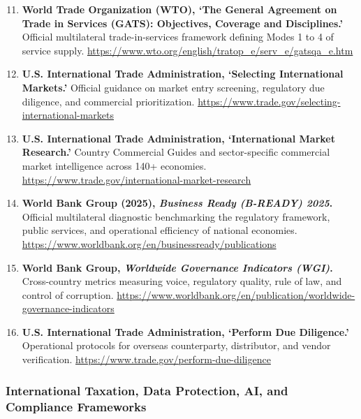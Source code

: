\begin{enumerate}
    \setcounter{enumi}{10}
    \item \textbf{World Trade Organization (WTO), `The General Agreement on Trade in Services (GATS): Objectives, Coverage and Disciplines.'} Official multilateral trade-in-services framework defining Modes 1 to 4 of service supply. \url{https://www.wto.org/english/tratop_e/serv_e/gatsqa_e.htm}
    \item \textbf{U.S. International Trade Administration, `Selecting International Markets.'} Official guidance on market entry screening, regulatory due diligence, and commercial prioritization. \url{https://www.trade.gov/selecting-international-markets}
    \item \textbf{U.S. International Trade Administration, `International Market Research.'} Country Commercial Guides and sector-specific commercial market intelligence across 140+ economies. \url{https://www.trade.gov/international-market-research}
    \item \textbf{World Bank Group (2025), \textit{Business Ready (B-READY) 2025}.} Official multilateral diagnostic benchmarking the regulatory framework, public services, and operational efficiency of national economies. \url{https://www.worldbank.org/en/businessready/publications}
    \item \textbf{World Bank Group, \textit{Worldwide Governance Indicators (WGI)}.} Cross-country metrics measuring voice, regulatory quality, rule of law, and control of corruption. \url{https://www.worldbank.org/en/publication/worldwide-governance-indicators}
    \item \textbf{U.S. International Trade Administration, `Perform Due Diligence.'} Operational protocols for overseas counterparty, distributor, and vendor verification. \url{https://www.trade.gov/perform-due-diligence}
\end{enumerate}

\subsubsection*{International Taxation, Data Protection, AI, and Compliance Frameworks}

